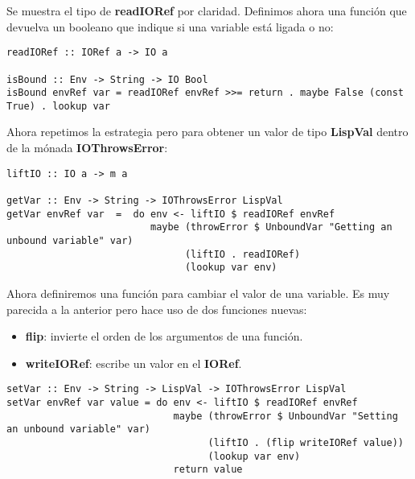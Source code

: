 Se muestra el tipo de \textbf{readIORef} por claridad. Definimos ahora una funci\'on que devuelva un booleano que indique si una variable est\'a ligada o no:\\

\begin{minipage}{\linewidth}
\begin{tiny}
\begin{lstlisting}[frame=single]
readIORef :: IORef a -> IO a

isBound :: Env -> String -> IO Bool
isBound envRef var = readIORef envRef >>= return . maybe False (const True) . lookup var
\end{lstlisting}
\end{tiny}
\end{minipage}

Ahora repetimos la estrategia pero para obtener un valor de tipo \textbf{LispVal} dentro de la m\'onada \textbf{IOThrowsError}:\\ 

\begin{minipage}{\linewidth}
\begin{tiny}
\begin{lstlisting}[frame=single]
liftIO :: IO a -> m a

getVar :: Env -> String -> IOThrowsError LispVal
getVar envRef var  =  do env <- liftIO $ readIORef envRef
                         maybe (throwError $ UnboundVar "Getting an unbound variable" var)
                               (liftIO . readIORef)
                               (lookup var env)
\end{lstlisting}
\end{tiny}
\end{minipage}

Ahora definiremos una funci\'on para cambiar el valor de una variable. Es muy parecida a la anterior pero hace uso de dos funciones nuevas:

\begin{itemize}
  \item \textbf{flip}: invierte el orden de los argumentos de una funci\'on.
  \item \textbf{writeIORef}: escribe un valor en el \textbf{IORef}.
\end{itemize}

\begin{minipage}{\linewidth}
\begin{tiny}
\begin{lstlisting}[frame=single]
setVar :: Env -> String -> LispVal -> IOThrowsError LispVal
setVar envRef var value = do env <- liftIO $ readIORef envRef
                             maybe (throwError $ UnboundVar "Setting an unbound variable" var)
                                   (liftIO . (flip writeIORef value))
                                   (lookup var env)
                             return value
\end{lstlisting}
\end{tiny}
\end{minipage}

